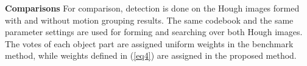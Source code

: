 \documentclass{mva2011}
\begin{document}
\textbf{Comparisons} For comparison, detection is done on the Hough images formed with and without motion grouping results. The same codebook and the same parameter settings are used for forming and searching over both Hough images. The votes of each object part are assigned uniform weights in the benchmark method, while weights defined in (\ref{eq4}) are assigned in the proposed method.
\begin{figure}
\centering
{}
\end{figure}
\end{document}
